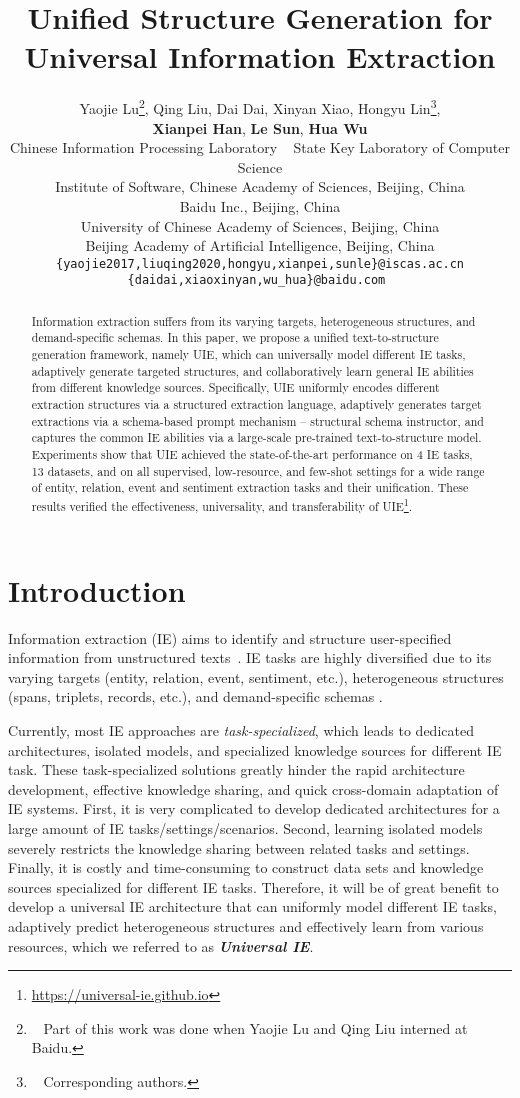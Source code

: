 \documentclass[11pt]{article}
\title{Unified Structure Generation for Universal Information Extraction}
\author{
  Yaojie Lu\thanks{~ Part of this work was done when Yaojie Lu and Qing Liu interned at Baidu.},
  Qing Liu\footnotemark[1],
  Dai Dai,
  Xinyan Xiao,
  Hongyu Lin\thanks{~ Corresponding authors.},
  \\
  \textbf{Xianpei Han},
  \textbf{Le Sun}\footnotemark[2],
  \textbf{Hua Wu}
  \\
  Chinese Information Processing Laboratory ~
  State Key Laboratory of Computer Science \\
  Institute of Software, Chinese Academy of Sciences, Beijing, China\\
  Baidu Inc., Beijing, China \\
  University of Chinese Academy of Sciences, Beijing, China \\
  Beijing Academy of Artificial Intelligence, Beijing, China \\
 {\tt \{yaojie2017,liuqing2020,hongyu,xianpei,sunle\}@iscas.ac.cn} \\
 {\tt \{daidai,xiaoxinyan,wu\_hua\}@baidu.com }
}
\begin{document}
\maketitle
\begin{abstract}
Information extraction suffers from its varying targets, heterogeneous structures, and demand-specific schemas.
In this paper, we propose a unified text-to-structure generation framework, namely UIE, which can universally model different IE tasks, adaptively generate targeted structures, and collaboratively learn general IE abilities from different knowledge sources. 
Specifically, UIE uniformly encodes different extraction structures via a structured extraction language, adaptively generates target extractions via a schema-based prompt mechanism – structural schema instructor, and captures the common IE abilities via a large-scale pre-trained text-to-structure model. 
Experiments show that UIE achieved the state-of-the-art performance on 4 IE tasks, 13 datasets, and on all supervised, low-resource, and few-shot settings for a wide range of entity, relation, event and sentiment extraction tasks and their unification.
These results verified the effectiveness, universality, and transferability of UIE\footnote{\url{https://universal-ie.github.io}}. \end{abstract}

\section{Introduction} \label{sec:introduction}

Information extraction (IE) aims to identify and structure user-specified information from unstructured texts~\citep{andersen-etal-1992-automatic,grishman_2019}.
IE tasks are highly diversified due to its varying targets (entity, relation, event, sentiment, etc.), heterogeneous structures (spans, triplets, records, etc.), and demand-specific schemas \citep{grishman-sundheim-1996-message,ace2004-annotation,ji-grishman-2011-knowledge}.

Currently, most IE approaches are \textit{task-specialized}, which leads to dedicated architectures, isolated models, and specialized knowledge sources for different IE task.
These task-specialized solutions greatly hinder the rapid architecture development, effective knowledge sharing, and quick cross-domain  adaptation of IE systems.
First, it is very complicated to develop dedicated architectures for a large amount of IE tasks/settings/scenarios.
Second, learning isolated models severely restricts the knowledge sharing between related tasks and settings. 
Finally, it is costly and time-consuming to construct data sets and knowledge sources specialized for different IE tasks.
Therefore, it will be of great benefit to develop a universal IE architecture that can uniformly model different IE tasks, adaptively predict heterogeneous structures and effectively learn from various resources, which we referred to as \textit{\textbf{Universal IE}}.
\end{document}
